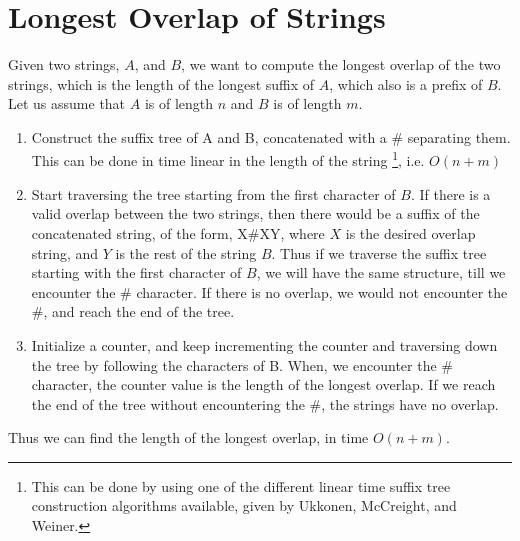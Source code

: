 \documentclass{article}
\begin{document}
\clearpage

\section{Longest Overlap of Strings}
Given two strings, $A$, and $B$, we want to compute the longest overlap of the two strings, which is the length of the longest suffix of $A$, which also is a prefix of $B$. Let us assume that $A$ is of length $n$ and $B$ is of length $m$.

\begin{enumerate}
\item {Construct the suffix tree of A and B, concatenated with a \# separating them. This can be done in time linear in the length of the string \footnote{This can be done by using one of the different linear time suffix tree construction algorithms available, given by Ukkonen, McCreight, and Weiner.}, i.e. $O(n+m)$ }
\item {Start traversing the tree starting from the first character of $B$. If there is a valid overlap between the two strings, then there would be a suffix of the concatenated string, of the form, X\#XY, where $X$ is the desired overlap string, and $Y$ is the rest of the string $B$. Thus if we traverse the suffix tree starting with the first character of $B$, we will have the same structure, till we encounter the \# character. If there is no overlap, we would not encounter the \#, and reach the end of the tree.}
\item {Initialize a counter, and keep incrementing the counter and traversing down the tree by following the characters of B. When, we encounter the \# character, the counter value is the length of the longest overlap. If we reach the end of the tree without encountering the \#, the strings have no overlap.} 
\end{enumerate}

Thus we can find the length of the longest overlap, in time $O(n+m)$.
\clearpage
\end{document}

